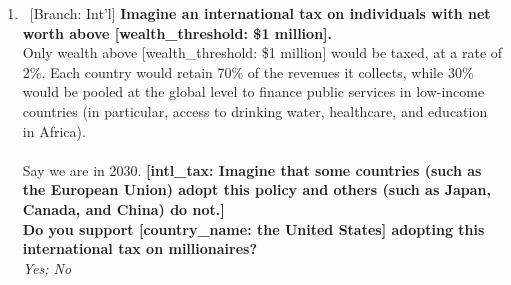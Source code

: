 \begin{enumerate}[resume]
\item ~[Branch: Int'l] \label{q:intl_tax_support} \textbf{Imagine an international tax on individuals with net worth above [wealth\_threshold: \$1 million].~}\\Only wealth above [wealth\_threshold: \$1 million] would be taxed, at a rate of 2\%. Each country would retain 70\% of the revenues it collects, while 30\% would be pooled at the global level to finance public services in low-income countries (in particular, access to drinking water, healthcare, and education in Africa). \\\\Say we are in 2030.\textbf{ [intl\_tax: Imagine that some countries  (such as the European Union) adopt this policy and others (such as Japan, Canada, and China) do not.]\\Do you support [country\_name: the United States] adopting this international tax on millionaires?}
  \\ \textit{Yes; No}

\end{enumerate} 

